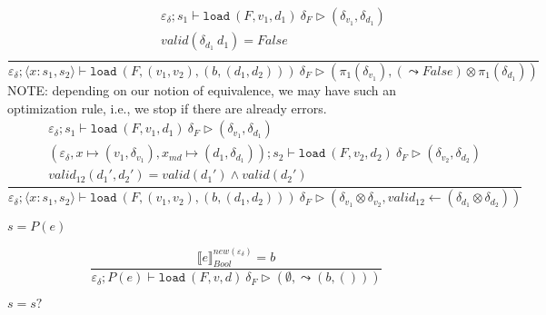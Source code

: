 \documentclass[10pt,twoside,a4paper]{article}
\theoremstyle{theorem}
\theoremstyle{lemma}
\theoremstyle{property}
\begin{document}
\begin{displaymath}
	\frac{\begin{array}{c}
		\varepsilon_\delta ; s_1 \vdash \mathtt{load}~ (F,v_1,d_1)~ \delta_F \rhd (\delta_{v_1},\delta_{d_1})\\
		valid(\delta_{d_1} ~ d_1) = False\\
	\end{array}}
	{\varepsilon_\delta ; \langle x:s_1,s_2 \rangle \vdash \mathtt{load}~ (F,(v_1,v_2),(b,(d_1,d_2)))~ \delta_F \rhd (\pi_1(\delta_{v_1}) , (\leadsto False) \otimes \pi_1 (\delta_{d_1})) }
\end{displaymath}
NOTE: depending on our notion of equivalence, we may have such an optimization rule, i.e., we stop if there are already errors.
\begin{displaymath}
	\frac{\begin{array}{c}
		\varepsilon_\delta ; s_1 \vdash \mathtt{load}~ (F,v_1,d_1)~ \delta_F \rhd (\delta_{v_1},\delta_{d_1})\\
		(\varepsilon_\delta,x \mapsto (v_1,\delta_{v_1}),x_{md} \mapsto (d_1,\delta_{d_1})) ; s_2 \vdash \mathtt{load}~ (F,v_2,d_2)~ \delta_F \rhd (\delta_{v_2},\delta_{d_2})\\
		valid_{12}({d_1}',{d_2}') = valid({d_1}') \wedge valid({d_2}')
	\end{array}}
	{\varepsilon_\delta ; \langle x:s_1,s_2 \rangle \vdash \mathtt{load}~ (F,(v_1,v_2),(b,(d_1,d_2)))~ \delta_F \rhd (\delta_{v_1} \otimes \delta_{v_2},valid_{12} \leftarrow (\delta_{d_1} \otimes \delta_{d_2})) }
\end{displaymath}

$\boxed{s = P(e)}$

\begin{displaymath}
	\frac{\llbracket e \rrbracket^{new(\varepsilon_\delta)}_{Bool} = b}
	{\varepsilon_\delta ; P(e) \vdash \mathtt{load}~ (F,v,d)~ \delta_F \rhd (\emptyset,\leadsto (b,()))}
\end{displaymath}

$\boxed{s = s?}$
\end{document}
